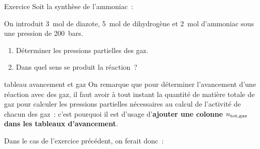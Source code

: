 \documentclass[../main/main.tex]{subfiles}
\begin{document}
\begin{NCexem}[width=\linewidth, breakable]{Exercice}
    Soit la synthèse de l'ammoniac~:


    On introduit \SI{3}{mol} de diazote, \SI{5}{mol} de dihydrogène et
    \SI{2}{mol} d'ammoniac sous une pression de \SI{200}{bars}.
    \begin{enumerate}
        \item Déterminer les pressions partielles des gaz.
        \item Dans quel sens se produit la réaction~?
    \end{enumerate}
\end{NCexem}

\begin{ror}[label=ror:gaz]{tableau avancement et gaz}
    On remarque que pour déterminer l'avancement d'une réaction avec des gaz, il
    faut avoir à tout instant la quantité de matière totale de gaz pour calculer
    les pressions partielles nécessaires au calcul de l'activité de chacun des
    gaz~: c'est pourquoi il est d'usage d'\textbf{ajouter une colonne $n_{\rm
    tot, gaz}$ dans les tableaux d'avancement}.
\end{ror}

Dans le cas de l'exercice précédent, on ferait donc~:
\end{document}
